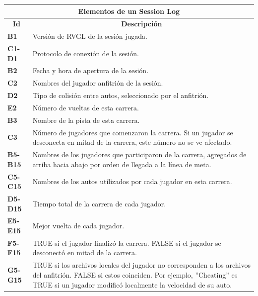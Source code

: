 \begin{center}
	\begin{tabular}{ | l | p{15cm} |}
		\hline
		\multicolumn{2}{|c|}{\textbf{Elementos de un Session Log}} \\
		\hline
		\multicolumn{1}{|c|}{\textbf{Id}} & \multicolumn{1}{|c|}{\textbf{Descripción}} \\
		\hline
		{\textbf{B1}} & Versión de RVGL de la sesión jugada. \\ \hline
		
		{\textbf{C1-D1}} & Protocolo de conexión de la sesión. \\ \hline
		
		{\textbf{B2}} & Fecha y hora de apertura de la sesión. \\ \hline
		
		{\textbf{C2}} & Nombres del jugador anfitrión de la sesión. \\ \hline
		
		{\textbf{D2}} & Tipo de colisión entre autos, seleccionado por el anfitrión. \\ \hline
		
		{\textbf{E2}} & Número de vueltas de esta carrera. \\ \hline
		
		{\textbf{B3}} & Nombre de la pista de esta carrera. \\ \hline
		
		{\textbf{C3}} & Número de jugadores que comenzaron la carrera. Si un jugador se desconecta en mitad de la carrera, este número no se ve afectado. \\ \hline
		
		{\textbf{B5-B15}} & Nombres de los jugadores que participaron de la carrera, agregados de arriba hacia abajo por orden de llegada a la línea de meta. \\ \hline
		
		{\textbf{C5-C15}} & Nombres de los autos utilizados por cada jugador en esta carrera. \\ \hline
		
		{\textbf{D5-D15}} & Tiempo total de la carrera de cada jugador.\\ \hline
		
		{\textbf{E5-E15}} & Mejor vuelta de cada jugador.\\ \hline
		
		{\textbf{F5-F15}} & TRUE si el jugador finalizó la carrera. FALSE si el jugador se desconectó en mitad de la carrera.\\ \hline
		
		{\textbf{G5-G15}} & TRUE si los archivos locales del jugador no corresponden a los archivos del anfitrión. FALSE si estos coinciden. Por ejemplo, ''Cheating'' es TRUE si un jugador modificó localmente la velocidad de su auto.\\ \hline
	\end{tabular}
\end{center}

